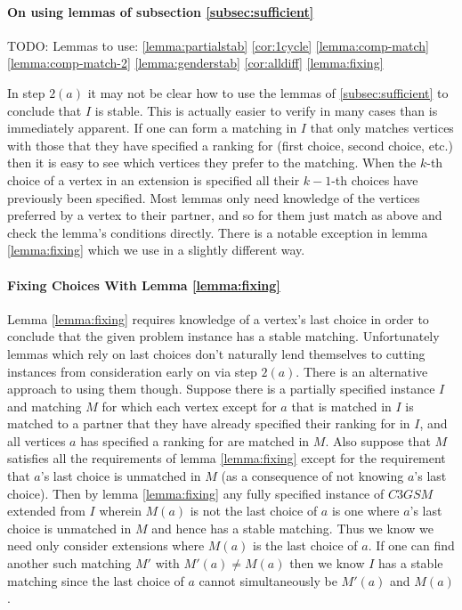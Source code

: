 \paragraph{On using lemmas of subsection \ref{subsec:sufficient}}

TODO: Lemmas to use: \ref{lemma:partialstab} \ref{cor:1cycle} \ref{lemma:comp-match} \ref{lemma:comp-match-2} \ref{lemma:genderstab}  \ref{cor:alldiff} \ref{lemma:fixing}

In step $2(a)$ it may not be clear how to use the lemmas of \ref{subsec:sufficient} to conclude that $I$ is stable. This is actually easier to verify in many cases than is immediately apparent. If one can form a matching in $I$ that only matches vertices with those that they have specified a ranking for (first choice, second choice, etc.) then it is easy to see which vertices they prefer to the matching. When the $k$-th choice of a vertex in an extension is specified all their $k-1$-th choices have previously been specified. Most lemmas only need knowledge of the vertices preferred by a vertex to their partner, and so for them just match as above and check the lemma's conditions directly. There is a notable exception in lemma \ref{lemma:fixing} which we use in a slightly different way.
\paragraph{Fixing Choices With Lemma \ref{lemma:fixing}}
Lemma \ref{lemma:fixing} requires knowledge of a vertex's last choice in order to conclude that the given problem instance has a stable matching. Unfortunately lemmas which rely on last choices don't naturally lend themselves to cutting instances from consideration early on via step $2(a)$. There is an alternative approach to using them though. Suppose there is a partially specified instance $I$ and matching $M$ for which each vertex except for $a$ that is matched in $I$ is matched to a partner that they have already specified their ranking for in $I$, and all vertices $a$ has specified a ranking for are matched in $M$. Also suppose that $M$ satisfies all the requirements of lemma \ref{lemma:fixing} except for the requirement that $a$'s last choice is unmatched in $M$ (as a consequence of not knowing $a$'s last choice). Then by lemma \ref{lemma:fixing} any fully specified instance of $C3GSM$ extended from $I$ wherein $M(a)$ is not the last choice of $a$ is one where $a$'s last choice is unmatched in $M$ and hence has a stable matching. Thus we know we need only consider extensions where $M(a)$ is the last choice of $a$. If one can find another such matching $M'$ with $M'(a) \neq M(a)$ then we know $I$ has a stable matching since the last choice of $a$ cannot simultaneously be $M'(a)$ and $M(a)$.
